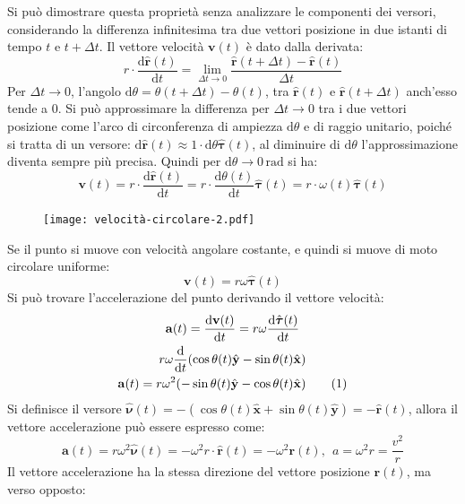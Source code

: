 \documentclass{article}
\newcommand{\vect}[1]{\boldsymbol{\mathbf{#1}}}
\newcommand{\df}{\mathrm{d}}
\numberwithin{equation}{subsection}
\begin{document}
Si può dimostrare questa proprietà senza analizzare le componenti 
dei versori, considerando la differenza infinitesima tra due 
vettori posizione in due istanti di tempo $t$ e $t+\Delta t$.
Il vettore velocità $\vect{v}(t)$ è dato dalla derivata: 
\begin{equation*}
    r\cdot\displaystyle\frac{\df\hat{\vect{r}}(t)}{\df t}=\lim_{\Delta t \to 0}\frac{\hat{\vect{r}}(t+\Delta t)-\hat{\vect{r}}(t)}{\Delta t}
\end{equation*}
Per $\Delta t \to 0$, 
l'angolo $\df\theta = \theta(t+\Delta t)-\theta(t)$, tra $\hat{\vect{r}}(t)$ e $\hat{\vect{r}}(t+\Delta t)$  
anch'esso tende a $0$. Si può approssimare la differenza per 
$\Delta t \to 0$ tra i due vettori posizione come l'arco di circonferenza di ampiezza $\df\theta$ e di raggio unitario, poiché si tratta di un versore: $\df\hat{\vect{r}}(t)\approx1\cdot \df\theta\hat{\vect\tau}(t)$, al diminuire di $\df\theta$ 
l'approssimazione diventa sempre più precisa. 
Quindi per $\df\theta\to0\,\mathrm{rad}$ si ha:
\begin{equation*}
    \vect{v}(t)=r\cdot\displaystyle\frac{\df\hat{\vect{r}}(t)}{\df t}=r\cdot\frac{\df\theta(t)}{\df t}\hat{\vect{\tau}}(t)=r\cdot\omega(t)\hat{\vect{\tau}}(t)
\end{equation*}
\begin{figure}[H]%
    \centering
    \texttt{[image: velocità-circolare-2.pdf]}%
\end{figure}

Se il punto si muove con velocità angolare costante, e quindi si 
muove di moto circolare uniforme:
\begin{equation}
    \vect{v}(t)=r\omega\hat{\vect{\tau}}(t)
\end{equation}
Si può trovare l'accelerazione del punto derivando il vettore 
velocità:
\begin{gather*}
    \vect{a}(t)=\displaystyle\frac{\df\vect{v}(t)}{\df t}=
    r\omega\frac{\df\hat{\vect{\tau}}(t)}{\df t}\\
    r\omega\frac{\df}{\df t}(\cos\theta(t)\hat{\vect{y}}-\sin\theta(t)\hat{\vect{x}})\\
    \vect{a}(t)=    r\omega^{2}(-\sin\theta(t)\hat{\vect{y}}-\cos\theta(t)\hat{\vect{x}})\tag{\stepcounter{equation}\theequation}
\end{gather*}
Si definisce il versore $\hat{\vect{\nu}}(t)=-(\cos\theta(t)\hat{\vect{x}}+\sin\theta(t)\hat{\vect{y}})=-\hat{\vect{r}}(t)$, allora il vettore accelerazione può essere espresso come:
\begin{equation}
    \vect{a}(t)=r\omega^{2}\hat{\vect{\nu}}(t)=-\omega^{2}r\cdot\hat{\vect{r}}(t)=-\omega^{2}\vect{r}(t){,}\:\: a=\omega^{2}r=\displaystyle\frac{v^{2}}{r}
\end{equation}
Il vettore accelerazione ha la stessa direzione del vettore 
posizione $\vect{r}(t)$, ma verso opposto:
\end{document}
